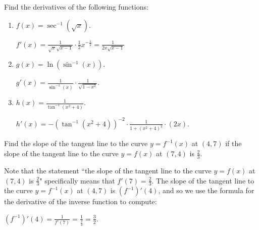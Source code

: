 \documentclass[nooutcomes]{ximera}
\begin{document}
\begin{problem}
Find the derivatives of the following functions:
	\begin{enumerate}
	
	\item  $f(x) = \sec^{-1} (\sqrt{x})$.
		\begin{freeResponse}
		$f'(x) = \frac{1}{\sqrt{x} \sqrt{x - 1}} \cdot \frac{1}{2} x^{-\frac{1}{2}} = \frac{1}{2x\sqrt{x-1}}$
		\end{freeResponse}
		
		
		
	\item  $g(x) = \ln (\sin^{-1}(x))$.
		\begin{freeResponse}
		$g'(x) = \frac{1}{\sin^{-1}(x)} \cdot \frac{1}{\sqrt{1-x^2}}$.
		\end{freeResponse}
		
		
		
	\item  $h(x) = \frac{1}{\tan^{-1}(x^2 + 4)}$.  
		\begin{freeResponse}
		$h'(x) = - \left( \tan^{-1}(x^2 + 4) \right)^{-2} \cdot \frac{1}{1 + (x^2 + 4)^2} \cdot (2x)$.
		\end{freeResponse}
		
		
		
	\end{enumerate}
		
		
\end{problem}

	
	
	
	
	
	
	
	
			
			

\begin{problem}
Find the slope of the tangent line to the curve $y = f^{-1}(x)$ at $(4,7)$ if the slope of the tangent line to the curve $y=f(x)$ at $(7,4)$ is $\frac{2}{3}$.  
		\begin{freeResponse}
		Note that the statement ``the slope of the tangent line to the curve $y=f(x)$ at $(7,4)$ is $\frac{2}{3}$" specifically means that $f'(7) = \frac{2}{3}$.  The slope of the tangent line to the curve $y = f^{-1}(x)$ at $(4,7)$ is $(f^{-1})'(4)$, and so we use the formula for the derivative of the inverse function to compute:
		
		$(f^{-1})'(4) = \frac{1}{f'(7)} = \frac{1}{\frac{2}{3}} = \frac{3}{2}$.
		\end{freeResponse}
		
		
		

\end{problem}
\end{document}
